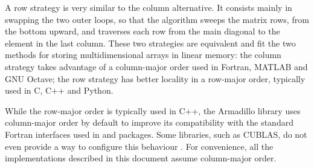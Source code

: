 \documentclass[../thesis]{subfiles}
\begin{document}
	A row strategy is very similar to the column alternative. It consists mainly in swapping the two outer loops, so that the algorithm sweeps the matrix rows, from the bottom upward, and traverses each row from the main diagonal to the element in the last column. These two strategies are equivalent and fit the two methods for storing multidimensional arrays in linear memory: the column strategy takes advantage of a column-major order used in Fortran, MATLAB and GNU Octave; the row strategy has better locality in a row-major order, typically used in C, C++ and Python.

	While the row-major order is typically used in C++, the Armadillo library uses column-major order by default to improve its compatibility with the standard Fortran interfaces used in \blas and \lapack packages. Some libraries, such as CUBLAS, do not even provide a way to configure this behaviour \cite{NVIDIA:CUBLAS:5:0}. For convenience, all the implementations described in this document assume column-major order.
\end{document}
